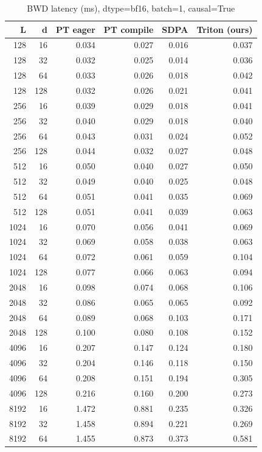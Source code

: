 \documentclass[11pt]{article}
\begin{document}
\begin{table}[H]\small\centering
\caption{BWD latency (ms), dtype=bf16, batch=1, causal=True}
\label{tab:fa2-bf16-bwd}
\begin{tabular}{rrrrrr}
\toprule
L & d & PT eager & PT compile & SDPA & Triton (ours) \\
\midrule
128 & 16 & 0.034 & 0.027 & 0.016 & 0.037 \\
128 & 32 & 0.032 & 0.025 & 0.014 & 0.036 \\
128 & 64 & 0.033 & 0.026 & 0.018 & 0.042 \\
128 & 128 & 0.032 & 0.026 & 0.021 & 0.041 \\
256 & 16 & 0.039 & 0.029 & 0.018 & 0.041 \\
256 & 32 & 0.040 & 0.029 & 0.018 & 0.040 \\
256 & 64 & 0.043 & 0.031 & 0.024 & 0.052 \\
256 & 128 & 0.044 & 0.032 & 0.027 & 0.048 \\
512 & 16 & 0.050 & 0.040 & 0.027 & 0.050 \\
512 & 32 & 0.049 & 0.040 & 0.025 & 0.048 \\
512 & 64 & 0.051 & 0.041 & 0.035 & 0.069 \\
512 & 128 & 0.051 & 0.041 & 0.039 & 0.063 \\
1024 & 16 & 0.070 & 0.056 & 0.041 & 0.069 \\
1024 & 32 & 0.069 & 0.058 & 0.038 & 0.063 \\
1024 & 64 & 0.072 & 0.061 & 0.059 & 0.104 \\
1024 & 128 & 0.077 & 0.066 & 0.063 & 0.094 \\
2048 & 16 & 0.098 & 0.074 & 0.068 & 0.106 \\
2048 & 32 & 0.086 & 0.065 & 0.065 & 0.092 \\
2048 & 64 & 0.089 & 0.068 & 0.103 & 0.171 \\
2048 & 128 & 0.100 & 0.080 & 0.108 & 0.152 \\
4096 & 16 & 0.207 & 0.147 & 0.124 & 0.180 \\
4096 & 32 & 0.204 & 0.146 & 0.118 & 0.150 \\
4096 & 64 & 0.208 & 0.151 & 0.194 & 0.305 \\
4096 & 128 & 0.216 & 0.160 & 0.200 & 0.273 \\
8192 & 16 & 1.472 & 0.881 & 0.235 & 0.326 \\
8192 & 32 & 1.458 & 0.894 & 0.221 & 0.269 \\
8192 & 64 & 1.455 & 0.873 & 0.373 & 0.581 \\

\end{tabular}
\end{table}
\end{document}

